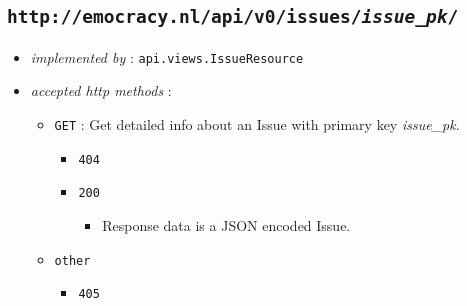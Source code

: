 \documentclass[a4paper]{report}
\begin{document}
\subsection{\texttt{http://emocracy.nl/api/v0/issues/\emph{issue\_pk}/}}
\begin{itemize}
    \item{\textsl{implemented by} : \texttt{api.views.IssueResource}}
    \item{\textsl{accepted http methods} :
        \begin{itemize}
            \item{\texttt{GET} : Get detailed info about an Issue with primary key \emph{issue\_pk}.
                \begin{itemize}
                    \item{\texttt{404}}
                    \item{\texttt{200}
                    \begin{itemize}
                        \item{Response data is a JSON encoded Issue.}
                    \end{itemize}
                    }
                \end{itemize}
            }
            \item{\texttt{other}
                \begin{itemize}
                    \item{\texttt{405}}
                \end{itemize}
            }
        \end{itemize}
    }
\end{itemize}
\end{document}
